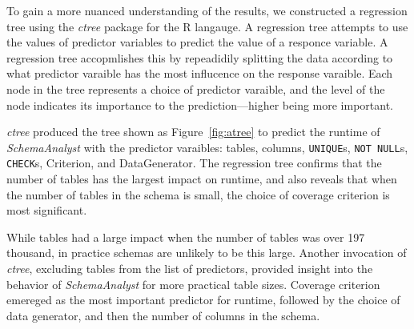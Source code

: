 To gain a more nuanced understanding of the results, we constructed a regression tree using the \textit{ctree} package
for the R langauge. A regression tree attempts to use the values of predictor variables to predict the value of a
responce variable. A regression tree accopmlishes this by repeadidily splitting the data according to what predictor
varaible has the most influcence on the response varaible. Each node in the tree represents a choice of predictor
varaible, and the level of the node indicates its importance to the prediction---higher being more important.

\textit{ctree} produced the tree shown as Figure~\ref{fig:atree} to predict the runtime of \textit{SchemaAnalyst} with
the predictor varaibles: tables, columns, {\tt UNIQUE}s, {\tt NOT NULL}s, {\tt CHECK}s, Criterion, and DataGenerator.
The regression tree confirms that the number of tables has the largest impact on runtime, and also reveals that when the
number of tables in the schema is small, the choice of coverage criterion is most significant.

While tables had a large impact when the number of tables was over 197 thousand, in practice schemas are unlikely to be
this large. Another invocation of \textit{ctree}, excluding tables from the list of predictors, provided insight into
the behavior of \textit{SchemaAnalyst} for more practical table sizes. Coverage criterion emereged as the most important
predictor for runtime, followed by the choice of data generator, and then the number of columns in the schema.
